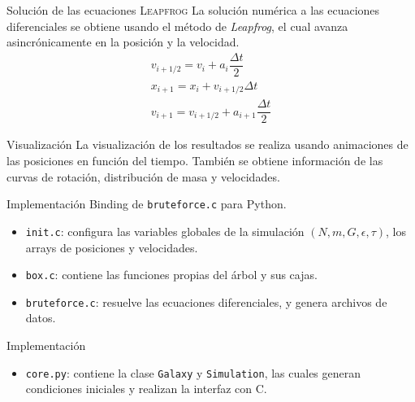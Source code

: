 \documentclass{beamer}
\begin{document}
\begin{frame}{Soluci\'on de las ecuaciones}
	{\scshape Leapfrog}
	La soluci\'on num\'erica a las ecuaciones diferenciales se obtiene usando el m\'etodo de \textit{Leapfrog}, el cual avanza asincr\'onicamente en la posici\'on y la velocidad.
	\begin{equation}
		\begin{matrix}
			v_{i+1/2} = v_i + a_i\dfrac{\Delta t}{2}\\
			x_{i+1} = x_i + v_{i+1/2}\Delta t \\
			v_{i+1} = v_{i+1/2}+a_{i+1}\dfrac{\Delta t}{2}
		\end{matrix}
	\end{equation}
\end{frame}

\begin{frame}{Visualizaci\'on}
	La visualizaci\'on de los resultados se realiza usando animaciones de las posiciones en funci\'on del tiempo. Tambi\'en se obtiene informaci\'on de las curvas de rotaci\'on, distribuci\'on de masa y velocidades.
\end{frame}
\begin{frame}{Implementaci\'on}
	Binding de \texttt{bruteforce.c} para Python.
	\begin{tcolorbox}[colback=green!5,colframe=green!40!black,title=C Programming Language]
		\begin{itemize}
			\item \texttt{init.c}: configura las variables globales de la simulaci\'on $(N, m, G, \epsilon, \tau)$, los arrays de posiciones y velocidades.
			\item \texttt{box.c}: contiene las funciones propias del \'arbol y sus cajas.
			\item \texttt{bruteforce.c}: resuelve las ecuaciones diferenciales, y genera archivos de datos.
		\end{itemize}
	\end{tcolorbox}
\end{frame}
\begin{frame}{Implementaci\'on}
	\begin{tcolorbox}[colback=blue!5,colframe=blue!40!black,title=Python]
		\begin{itemize}
			\item \texttt{core.py}: contiene la clase \texttt{Galaxy} y \texttt{Simulation}, las cuales generan condiciones iniciales y realizan la interfaz con C.
		\end{itemize}
	\end{tcolorbox}
\end{frame}
\end{document}
